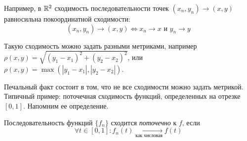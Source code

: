 \documentclass[../functional-analysis_17-18.tex]{subfiles}
\begin{document}
	Например, в $\mathbb{R}^2$ сходимость последовательности точек $(x_n, y_n) \to (x, y)$  равносильна покоординатной сходимости:
	\begin{equation}
		(x_n, y_n) \to (x, y) \iff x_n \to x \text{ и } y_n \to y
	\end{equation}
	
	Такую сходимость можно задать разными метриками, например $\rho(x, y) = \displaystyle \sqrt{(y_1 - x_1)^2 + (y_2 - x_2)^2}$, или $\rho(x, y) = \max(|y_1 - x_1|, |y_2 - x_2|)$. 
	
	Печальный факт состоит в том, что не все сходимости можно задать метрикой. Типичный пример: поточечная сходимость функций, определенных на отрезке $[0, 1]$. Напомним ее определение.
	
	\begin{definition}
		Последовательность функций $\{f_n\}$ сходится \textit{поточечно} к $f$, если
		\begin{equation}
			\forall t \in [0, 1]:  f_n(t) \underset{\text{как числовая}}{\longrightarrow} f(t)
		\end{equation}
	\end{definition}
\end{document}
